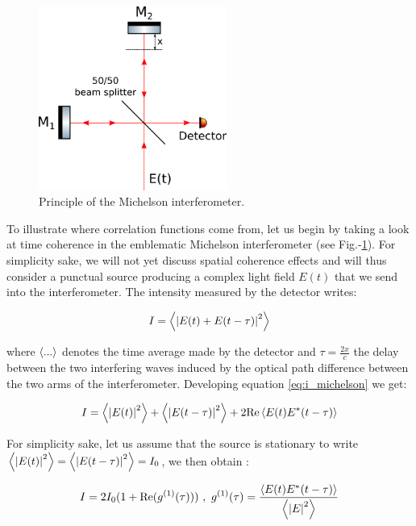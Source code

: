 \begin{figure}
    \centering
    \includegraphics[width=0.55\textwidth]{Fig/Chapter1/michelson.png}
    \caption{Principle of the Michelson interferometer.}
    \label{fig:michelson}
\end{figure}


To illustrate where correlation functions come from, let us begin by taking a look at time coherence in the emblematic Michelson interferometer (see Fig.-\ref{fig:michelson}). For simplicity sake, we will not yet discuss spatial coherence effects and will thus consider a punctual source producing a complex light field $E(t)$ that we send into the interferometer. The intensity measured by the detector writes:

\begin{equation}
    I=\left\langle\left\lvert E(t)+E(t-\tau)\right\rvert^2\right\rangle
    \label{eq:i_michelson}
\end{equation}

where $\left\langle...\right\rangle$ denotes the time average made by the detector and $\tau=\frac{2x}{c}$ the delay between the two interfering waves induced by the optical path difference between the two arms of the interferometer. Developing equation \ref{eq:i_michelson} we get:

\begin{equation}
    I=\left\langle\left\lvert E(t)\right\rvert^2\right\rangle + \left\langle\left\lvert E(t-\tau)\right\rvert^2\right\rangle + 2 {\rm{Re}} \left\langle E(t) E^*(t-\tau)\right\rangle
    \label{eq:def_g1}
\end{equation}

For simplicity sake, let us assume that the source is stationary to write $\left\langle\left\lvert E(t)\right\rvert^2\right\rangle = \left\langle\left\lvert E(t-\tau)\right\rvert^2\right\rangle = I_0$, we then obtain :

\begin{equation}
    I= 2 I_0 (1 + {\rm{Re}} (g^{(1)} (\tau))) \ , \ g^{(1)} (\tau) = \frac{ \left\langle E(t) E^*(t-\tau)\right\rangle}{\left\langle\left\lvert E\right\rvert^2\right\rangle}
\end{equation}

